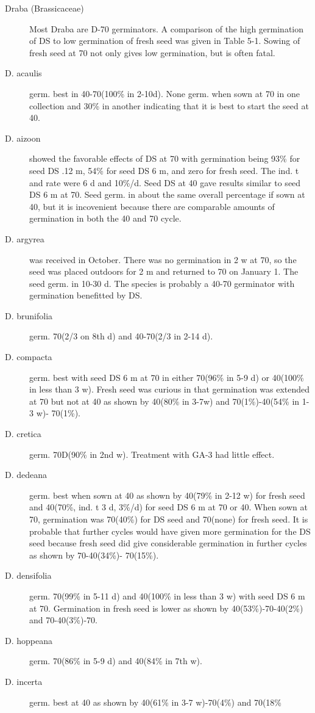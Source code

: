 \begin{description}
\item[Draba (Brassicaceae)] Most Draba are D-70 germinators. A comparison of
the high germination of DS to low germination of fresh seed was given in Table 5-1.
Sowing of fresh seed at 70 not only gives low germination, but is often fatal.
\item[D. acaulis] germ. best in 40-70(100\% in 2-10d). None germ. when sown at 70 in
one collection and 30\% in another indicating that it is best to start the seed at 40.
\item[D. aizoon] showed the favorable effects of DS at 70 with germination being 93\%
for seed DS .12 m, 54\% for seed DS 6 m, and zero for fresh seed. The ind. t and rate
were 6 d and 10\%/d. Seed DS at 40 gave results similar to seed DS 6 m at 70. Seed
germ. in about the same overall percentage if sown at 40, but it is incovenient because
there are comparable amounts of germination in both the 40 and 70 cycle.
\item[D. argyrea] was received in October. There was no germination in 2 w at 70, so
the seed was placed outdoors for 2 m and returned to 70 on January 1. The seed
germ. in 10-30 d. The species is probably a 40-70 germinator with germination
benefitted by DS.
\item[D. brunifolia] germ. 70(2/3 on 8th d) and 40-70(2/3 in 2-14 d).
\item[D. compacta] germ. best with seed DS 6 m at 70 in either 70(96\% in 5-9 d) or
40(100\% in less than 3 w). Fresh seed was curious in that germination was extended
at 70 but not at 40 as shown by 40(80\% in 3-7w) and 70(1\%)-40(54\% in 1-3 w)-
70(1\%).
\item[D. cretica] germ. 70D(90\% in 2nd w). Treatment with GA-3 had little effect.
\item[D. dedeana] germ. best when sown at 40 as shown by 40(79\% in 2-12 w) for
fresh seed and 40(70\%, ind. t 3 d, 3\%/d) for seed DS 6 m at 70 or 40. When sown at
70, germination was 70(40\%) for DS seed and 70(none) for fresh seed. It is probable
that further cycles would have given more germination for the DS seed because fresh
seed did give considerable germination in further cycles as shown by 70-40(34\%)-
70(15\%).
\item[D. densifolia] germ. 70(99\% in 5-11 d) and 40(100\% in less than 3 w) with seed
DS 6 m at 70. Germination in fresh seed is lower as shown by 40(53\%)-70-40(2\%)
and 70-40(3\%)-70.
\item[D. hoppeana] germ. 70(86\% in 5-9 d) and 40(84\% in 7th w).
\item[D. incerta] germ. best at 40 as shown by 40(61\% in 3-7 w)-70(4\%) and 70(18\%

\end{description}
